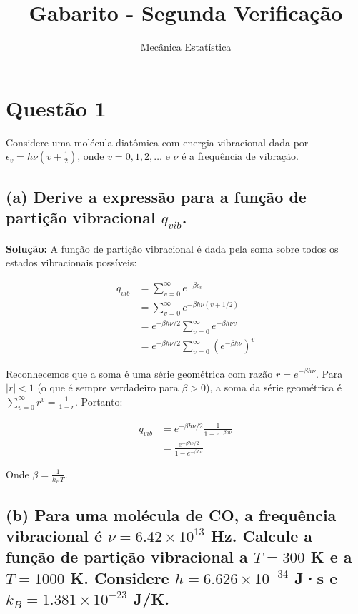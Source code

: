 \documentclass[fleqn,a4paper]{article}
\title{Gabarito - Segunda Verificação}
\author{Mecânica Estatística}
\date{}
\begin{document}
\maketitle

\section*{Questão 1}
Considere uma molécula diatômica com energia vibracional dada por $\epsilon_v = h\nu(v+\frac{1}{2})$, onde $v = 0, 1, 2, \ldots$ e $\nu$ é a frequência de vibração.

\subsection*{(a) Derive a expressão para a função de partição vibracional $q_{vib}$.}

\textbf{Solução:}
A função de partição vibracional é dada pela soma sobre todos os estados vibracionais possíveis:

\begin{align}
q_{vib} &= \sum_{v=0}^{\infty} e^{-\beta \epsilon_v} \\
&= \sum_{v=0}^{\infty} e^{-\beta h\nu(v+1/2)} \\
&= e^{-\beta h\nu/2} \sum_{v=0}^{\infty} e^{-\beta h\nu v} \\
&= e^{-\beta h\nu/2} \sum_{v=0}^{\infty} (e^{-\beta h\nu})^v
\end{align}

Reconhecemos que a soma é uma série geométrica com razão $r = e^{-\beta h\nu}$. Para $|r| < 1$ (o que é sempre verdadeiro para $\beta > 0$), a soma da série geométrica é $\sum_{v=0}^{\infty} r^v = \frac{1}{1-r}$. Portanto:

\begin{align}
q_{vib} &= e^{-\beta h\nu/2} \frac{1}{1-e^{-\beta h\nu}} \\
&= \frac{e^{-\beta h\nu/2}}{1-e^{-\beta h\nu}}
\end{align}

Onde $\beta = \frac{1}{k_B T}$.

\subsection*{(b) Para uma molécula de CO, a frequência vibracional é $\nu = 6.42 \times 10^{13}$ Hz. Calcule a função de partição vibracional a $T = 300$ K e a $T = 1000$ K. Considere $h = 6.626 \times 10^{-34}$ J·s e $k_B = 1.381 \times 10^{-23}$ J/K.}
\end{document}
